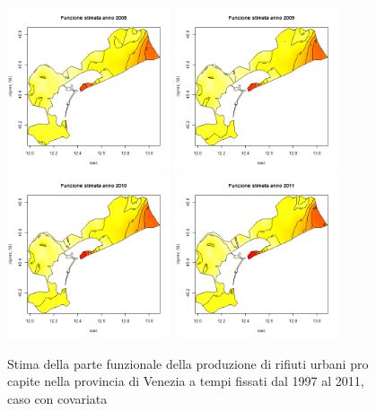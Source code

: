 \documentclass[a4paper,11pt,twoside,openright]{book}							%
\begin{document}
\begin{figure}[H]
	\includegraphics[width=0.43\textwidth ,height=0.235\textheight]{Immagini/venezia_con_covariate/Anno2008.png}
	\includegraphics[width=0.43\textwidth ,height=0.235\textheight]{Immagini/venezia_con_covariate/Anno2009.png}
	\includegraphics[width=0.43\textwidth ,height=0.235\textheight]{Immagini/venezia_con_covariate/Anno2010.png}
	\includegraphics[width=0.43\textwidth ,height=0.235\textheight]{Immagini/venezia_con_covariate/Anno2011.png}
\caption{Stima della parte funzionale della produzione di rifiuti urbani pro capite nella provincia di Venezia a tempi fissati dal 1997 al 2011, caso con covariata}
\label{fig:Vencovar_ris}
\end{figure}
\newpage
\end{document}
